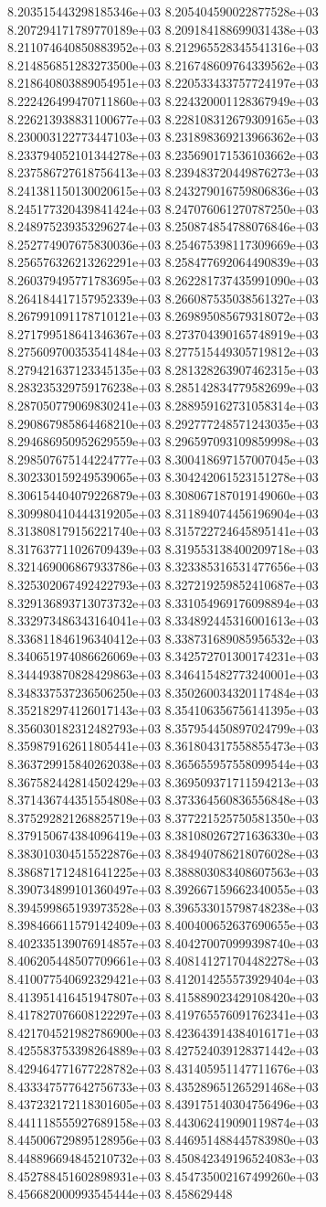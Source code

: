 8.203515443298185346e+03	8.205404590022877528e+03	8.207294171789770189e+03	8.209184188699031438e+03	8.211074640850883952e+03	8.212965528345541316e+03	8.214856851283273500e+03	8.216748609764339562e+03	8.218640803889054951e+03	8.220533433757724197e+03	8.222426499470711860e+03	8.224320001128367949e+03	8.226213938831100677e+03	8.228108312679309165e+03	8.230003122773447103e+03	8.231898369213966362e+03	8.233794052101344278e+03	8.235690171536103662e+03	8.237586727618756413e+03	8.239483720449876273e+03	8.241381150130020615e+03	8.243279016759806836e+03	8.245177320439841424e+03	8.247076061270787250e+03	8.248975239353296274e+03	8.250874854788076846e+03	8.252774907675830036e+03	8.254675398117309669e+03	8.256576326213262291e+03	8.258477692064490839e+03	8.260379495771783695e+03	8.262281737435991090e+03	8.264184417157952339e+03	8.266087535038561327e+03	8.267991091178710121e+03	8.269895085679318072e+03	8.271799518641346367e+03	8.273704390165748919e+03	8.275609700353541484e+03	8.277515449305719812e+03	8.279421637123345135e+03	8.281328263907462315e+03	8.283235329759176238e+03	8.285142834779582699e+03	8.287050779069830241e+03	8.288959162731058314e+03	8.290867985864468210e+03	8.292777248571243035e+03	8.294686950952629559e+03	8.296597093109859998e+03	8.298507675144224777e+03	8.300418697157007045e+03	8.302330159249539065e+03	8.304242061523151278e+03	8.306154404079226879e+03	8.308067187019149060e+03	8.309980410444319205e+03	8.311894074456196904e+03	8.313808179156221740e+03	8.315722724645895141e+03	8.317637711026709439e+03	8.319553138400209718e+03	8.321469006867933786e+03	8.323385316531477656e+03	8.325302067492422793e+03	8.327219259852410687e+03	8.329136893713073732e+03	8.331054969176098894e+03	8.332973486343164041e+03	8.334892445316001613e+03	8.336811846196340412e+03	8.338731689085956532e+03	8.340651974086626069e+03	8.342572701300174231e+03	8.344493870828429863e+03	8.346415482773240001e+03	8.348337537236506250e+03	8.350260034320117484e+03	8.352182974126017143e+03	8.354106356756141395e+03	8.356030182312482793e+03	8.357954450897024799e+03	8.359879162611805441e+03	8.361804317558855473e+03	8.363729915840262038e+03	8.365655957558099544e+03	8.367582442814502429e+03	8.369509371711594213e+03	8.371436744351554808e+03	8.373364560836556848e+03	8.375292821268825719e+03	8.377221525750581350e+03	8.379150674384096419e+03	8.381080267271636330e+03	8.383010304515522876e+03	8.384940786218076028e+03	8.386871712481641225e+03	8.388803083408607563e+03	8.390734899101360497e+03	8.392667159662340055e+03	8.394599865193973528e+03	8.396533015798748238e+03	8.398466611579142409e+03	8.400400652637690655e+03	8.402335139076914857e+03	8.404270070999398740e+03	8.406205448507709661e+03	8.408141271704482278e+03	8.410077540692329421e+03	8.412014255573929404e+03	8.413951416451947807e+03	8.415889023429108420e+03	8.417827076608122297e+03	8.419765576091762341e+03	8.421704521982786900e+03	8.423643914384016171e+03	8.425583753398264889e+03	8.427524039128371442e+03	8.429464771677228782e+03	8.431405951147711676e+03	8.433347577642756733e+03	8.435289651265291468e+03	8.437232172118301605e+03	8.439175140304756496e+03	8.441118555927689158e+03	8.443062419090119874e+03	8.445006729895128956e+03	8.446951488445783980e+03	8.448896694845210732e+03	8.450842349196524083e+03	8.452788451602898931e+03	8.454735002167499260e+03	8.456682000993545444e+03	8.458629448